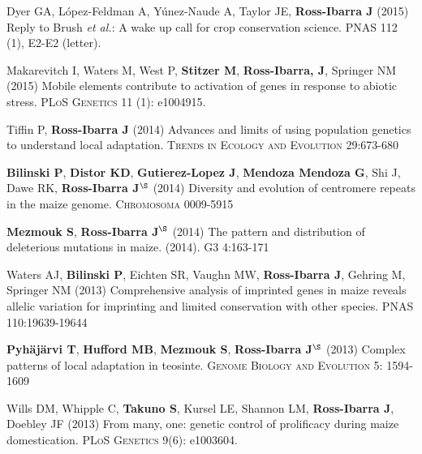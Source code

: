 \documentclass[letterpaper,10pt]{article}
\begin{document}
\begin{etaremune}
\item Dyer GA, L\'opez-Feldman A, Y\'unez-Naude A, Taylor JE, {\bf Ross-Ibarra J} (2015) Reply to Brush \emph{et al.}: A wake up call for crop conservation science. PNAS 112 (1), E2-E2 (letter).


\item Makarevitch I, Waters M, West P, {\bf Stitzer M}, {\bf Ross-Ibarra, J}, Springer NM (2015) Mobile elements contribute to activation of genes in response to abiotic stress. \textsc{PLoS Genetics} 11 (1): e1004915. %


\item Tiffin P, {\bf Ross-Ibarra J} (2014) Advances and limits of using population genetics to understand local adaptation. \textsc{Trends in Ecology and Evolution} 29:673-680 %


\item {\bf Bilinski P}, {\bf Distor KD}, {\bf Gutierez-Lopez J}, {\bf Mendoza Mendoza G}, Shi J, Dawe RK,  {\bf Ross-Ibarra J}$^\S$ (2014) Diversity and evolution of centromere repeats in the maize genome. \textsc{Chromosoma} 0009-5915

\item {\bf Mezmouk S}, {\bf Ross-Ibarra J}$^\S$ (2014) The pattern and distribution of deleterious mutations in maize. (2014). \textsc{G3} 4:163-171

\item Waters AJ, {\bf Bilinski P}, Eichten SR, Vaughn MW, {\bf Ross-Ibarra J}, Gehring M, Springer NM (2013) Comprehensive analysis of imprinted genes in maize reveals allelic variation for imprinting and limited conservation with other species. \textsc{PNAS} 110:19639-19644


\item {\bf Pyh\"aj\"arvi T}, {\bf Hufford MB}, {\bf Mezmouk S}, {\bf Ross-Ibarra J}$^\S$ (2013) Complex patterns of local adaptation in teosinte. \textsc{Genome Biology and Evolution} 5: 1594-1609 %


\item Wills DM, Whipple C, {\bf Takuno S}, Kursel LE, Shannon LM, {\bf Ross-Ibarra J}, Doebley JF (2013) From many, one: genetic control of prolificacy during maize domestication. \textsc{PLoS Genetics} 9(6): e1003604. %



\end{etaremune}
\end{document}
